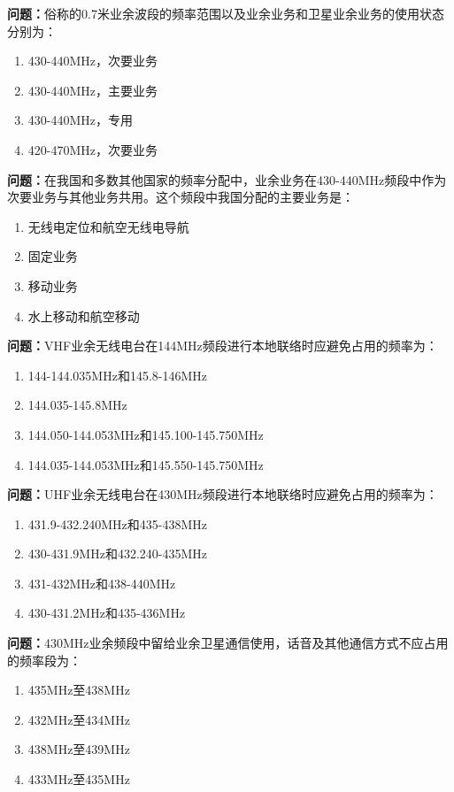 \noindent\textbf{问题：}俗称的0.7米业余波段的频率范围以及业余业务和卫星业余业务的使用状态分别为：
\begin{enumerate}[label=\Alph*), leftmargin=3em]
\item 430-440MHz，次要业务
\item 430-440MHz，主要业务
\item 430-440MHz，专用
\item 420-470MHz，次要业务
\end{enumerate}

\bigskip


\noindent\textbf{问题：}在我国和多数其他国家的频率分配中，业余业务在430-440MHz频段中作为次要业务与其他业务共用。这个频段中我国分配的主要业务是：
\begin{enumerate}[label=\Alph*), leftmargin=3em]
\item 无线电定位和航空无线电导航
\item 固定业务
\item 移动业务
\item 水上移动和航空移动
\end{enumerate}

\bigskip


\noindent\textbf{问题：}VHF业余无线电台在144MHz频段进行本地联络时应避免占用的频率为：
\begin{enumerate}[label=\Alph*), leftmargin=3em]
\item 144-144.035MHz和145.8-146MHz
\item 144.035-145.8MHz
\item 144.050-144.053MHz和145.100-145.750MHz
\item 144.035-144.053MHz和145.550-145.750MHz
\end{enumerate}

\bigskip


\noindent\textbf{问题：}UHF业余无线电台在430MHz频段进行本地联络时应避免占用的频率为：
\begin{enumerate}[label=\Alph*), leftmargin=3em]
\item 431.9-432.240MHz和435-438MHz
\item 430-431.9MHz和432.240-435MHz
\item 431-432MHz和438-440MHz
\item 430-431.2MHz和435-436MHz
\end{enumerate}

\bigskip


\noindent\textbf{问题：}430MHz业余频段中留给业余卫星通信使用，话音及其他通信方式不应占用的频率段为：
\begin{enumerate}[label=\Alph*), leftmargin=3em]
\item 435MHz至438MHz
\item 432MHz至434MHz
\item 438MHz至439MHz
\item 433MHz至435MHz
\end{enumerate}

